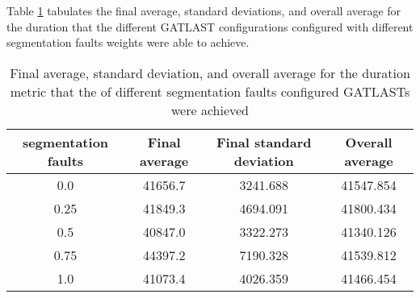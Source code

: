 Table \ref{tab:HP:GA:SegFault:duration} tabulates the final average, standard deviations, and overall average for the duration that the different GATLAST configurations configured with different segmentation faults weights were able to achieve.
\begin{table}[tbh!]
\centering
\begin{adjustbox}{trim=0cm 0cm 0cm 0cm, clip=true}
\begin{tabular}{|c|c|c|c|}
\hline
segmentation faults & Final average & Final standard deviation & Overall average\\
\hline
0.0 & 41656.7 & 3241.688 & 41547.854\\\hline
0.25 & 41849.3 & 4694.091 & 41800.434\\\hline
0.5 & 40847.0 & 3322.273 & 41340.126\\\hline
0.75 & 44397.2 & 7190.328 & 41539.812\\\hline
1.0 & 41073.4 & 4026.359 & 41466.454\\\hline
\end{tabular}
\end{adjustbox}
\caption{Final average, standard deviation, and overall average for the duration metric that the of different segmentation faults configured GATLASTs were achieved}
\label{tab:HP:GA:SegFault:duration}
\end{table}